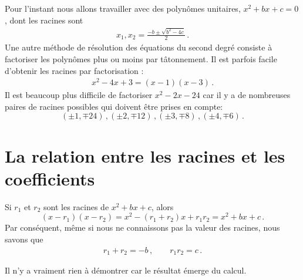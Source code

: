 Pour l'instant nous allons travailler avec des polynômes unitaires, $x^2+bx+c=0$, dont les racines sont 
\begin{align}
x_1, x_2 = \frac{-b\pm\sqrt{b^2-4c}}{2}\,.\label{eq.quadratic-roots}
\end{align}
Une autre méthode de résolution des équations du second degré consiste à factoriser les polynômes plus ou moins par tâtonnement. Il est parfois facile d'obtenir les racines par factorisation :
\begin{align}
x^2-4x+3= (x-1)(x-3)\label{eq.quadratic-lill}\,.
\end{align}
Il est beaucoup plus difficile de factoriser $x^2-2x-24$ car il y a de nombreuses paires de racines possibles qui doivent être prises en compte:
\[
(\pm 1,\mp 24)\,, (\pm 2,\mp 12)\,, (\pm 3,\mp 8)\,, (\pm 4,\mp 6)\,.
\]

\section{La relation entre les racines et les coefficients}\label{s.computing}

\begin{theorem}\label{thm.roots-coefficients}
Si $r_1$ et $r_2$ sont les racines de $x^2+bx+c$, alors 
\[
(x-r_1)(x-r_2)=x^2 - (r_1+r_2)x + r_1r_2=x^2+bx+c\,.
\]
Par conséquent, même si nous ne connaissons pas la valeur des racines, nous savons que
\begin{align}\label{eq.viete-quad}
r_1+r_2 = -b\,,\quad\quad r_1r_2=c\,.
\end{align}
\end{theorem}

Il n'y a vraiment rien à démontrer car le résultat émerge du calcul.

